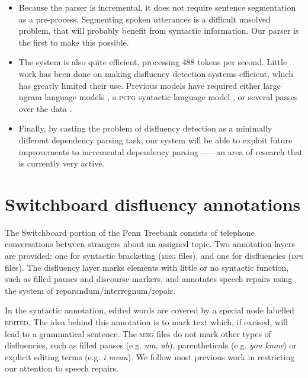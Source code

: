 \documentclass[11pt,letterpaper]{article}
\newcommand{\pcfg}{\textsc{pcfg}\xspace}
\begin{document}
\begin{itemize}
    \item Because the parser is incremental, it does not require sentence segmentation
        as a pre-process. Segmenting spoken utterances is a difficult unsolved
        problem, that will probably benefit from syntactic information. Our parser
        is the first to make this possible.

    \item The system is also quite efficient, processing 488 tokens per second.
        Little work has been done on making disfluency detection systems efficient,
        which has greatly limited their use. Previous models have required either
        large ngram language models \citep{zwarts:11}, a \pcfg syntactic language
        model \citep{Johnson04a}, or several passes over the data \citep{qian:13}.

    \item Finally, by casting the problem of disfluency detection as a minimally
           different dependency parsing task, our system will be able to exploit
           future improvements to incremental dependency parsing —-- an area of
           research that is currently very active.
\end{itemize}

\section{Switchboard disfluency annotations}
\label{sec:swbd}
The Switchboard portion of the Penn Treebank \citep{marcus:93} consists of
telephone conversations between strangers about
an assigned topic.  Two annotation layers are provided: one for syntactic
bracketing (\textsc{mrg} files),
and one for disfluencies (\textsc{dps} files).  The disfluency layer marks
elements with little or no syntactic function, such as filled pauses and discourse
markers, and annotates speech repairs using the \citet{shriberg:94} system of
reparandum/interregnum/repair.

In the syntactic annotation, edited words are covered by a special node labelled
\textsc{edited}.
The idea behind this annotation is to mark text which, if
excised, will lead to a grammatical sentence.  The \textsc{mrg} files do not
mark other types of disfluencies, such as filled pauses (e.g. \emph{um}, \emph{uh}),
parentheticals (e.g. \emph{you know}) or explicit editing terms (e.g. \emph{i mean}).
We follow most previous work in restricting our attention to speech repairs.
\end{document}
